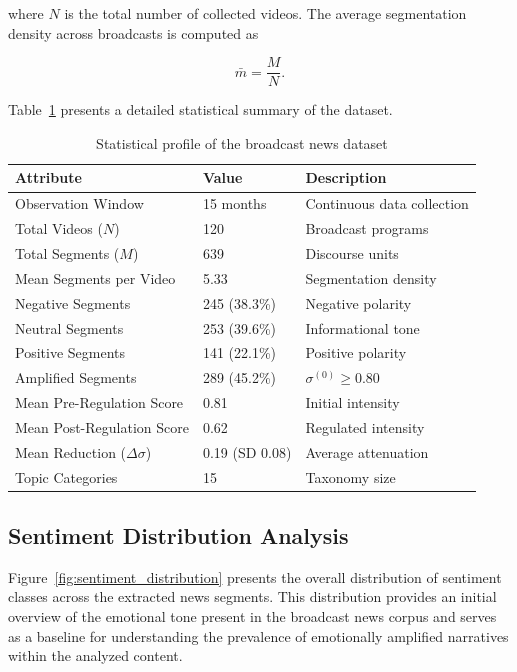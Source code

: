 \documentclass[final,1p,times]{elsarticle}
\begin{document}
where $N$ is the total number of collected videos. The average segmentation density across broadcasts is computed as

\[
\bar{m} = \frac{M}{N}.
\]

Table~\ref{tab:dataset_profile} presents a detailed statistical summary of the dataset.

\begin{table}[H]
\centering
\caption{Statistical profile of the broadcast news dataset}
\label{tab:dataset_profile}
\small
\begin{tabular}{p{5cm} p{3cm} p{5cm}}
\hline
Attribute & Value & Description \\
\hline
Observation Window & 15 months & Continuous data collection \\
Total Videos ($N$) & 120 & Broadcast programs \\
Total Segments ($M$) & 639 & Discourse units \\
Mean Segments per Video & 5.33 & Segmentation density \\
Negative Segments & 245 (38.3\%) & Negative polarity \\
Neutral Segments & 253 (39.6\%) & Informational tone \\
Positive Segments & 141 (22.1\%) & Positive polarity \\
Amplified Segments & 289 (45.2\%) & $\sigma^{(0)} \geq 0.80$ \\
Mean Pre-Regulation Score & 0.81 & Initial intensity \\
Mean Post-Regulation Score & 0.62 & Regulated intensity \\
Mean Reduction ($\Delta\sigma$) & 0.19 (SD 0.08) & Average attenuation \\
Topic Categories & 15 & Taxonomy size \\
\hline
\end{tabular}
\end{table}

\subsection{Sentiment Distribution Analysis}

Figure~\ref{fig:sentiment_distribution} presents the overall distribution of sentiment classes across the extracted news segments. This distribution provides an initial overview of the emotional tone present in the broadcast news corpus and serves as a baseline for understanding the prevalence of emotionally amplified narratives within the analyzed content.
\end{document}
